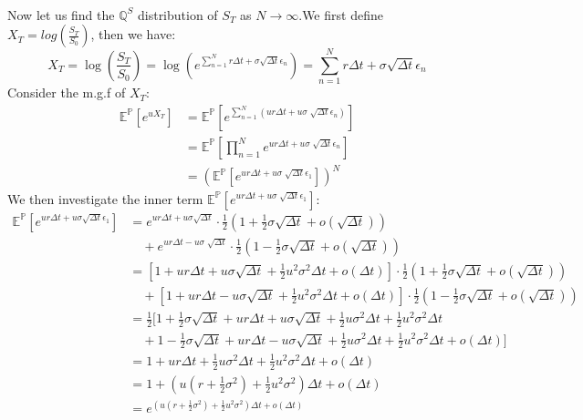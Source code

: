 \documentclass[12pt, letterpaper]{article}
\begin{document}
\\
Now let us find the $\mathbb{Q}^S$ distribution of $S_T$ as $N \rightarrow \infty$.We first define $X_T = log(\frac{S_T}{S_0})$, then we have: 
\[X_T = \log(\frac{S_T}{S_0}) = \log(e^{\sum_{n=1}^N r\Delta t + \sigma \sqrt{\Delta t} \epsilon_n}) = \sum_{n=1}^N r\Delta t + \sigma \sqrt{\Delta t} \epsilon_n \]
Consider the m.g.f of $X_T$:
\begin{align*}
  \mathbb{E}^\mathbb{P}[e^{u X_T}] & =  \mathbb{E}^\mathbb{P}[e^{\sum_{n=1}^N (u r\Delta t+u\sigma \sqrt[]{\Delta t} \epsilon_n)}] \\
  & = \mathbb{E}^\mathbb{P} [\prod_{n=1}^N e^{u r\Delta t+u\sigma \sqrt[]{\Delta t} \epsilon_n}] \\
  & = (\mathbb{E}^\mathbb{P} [e^{u r\Delta t+u\sigma \sqrt[]{\Delta t} \epsilon_1}])^N \tag*{as $\epsilon_n$ is i.i.d}
\end{align*}
We then investigate the inner term $\mathbb{E}^\mathbb{P} [e^{u r\Delta t+ u\sigma \sqrt[]{\Delta t} \epsilon_1}]$:
\begin{align*}
  \mathbb{E}^\mathbb{P} [e^{u r\Delta t+u\sigma \sqrt{\Delta t} \epsilon_1}] &= e^{u r\Delta t +u\sigma \sqrt{\Delta t}} \cdot \frac{1}{2} (1 + \frac{1}{2}{\sigma} \sqrt{\Delta t} + o(\sqrt{\Delta t})) \\ 
    & \quad + e^{u r\Delta t-u\sigma \sqrt[]{\Delta t}} \cdot \frac{1}{2} (1 - \frac{1}{2}{\sigma} \sqrt{\Delta t} + o(\sqrt{\Delta t})) \\
    &= [1+u r\Delta t+u \sigma \sqrt{\Delta t} +\frac{1}{2}u^2\sigma^2\Delta t + o(\Delta t)] \cdot \frac{1}{2} (1 + \frac{1}{2}{\sigma} \sqrt{\Delta t} + o(\sqrt{\Delta t})) \\ 
    & \quad + [1+u r\Delta t-u \sigma \sqrt{\Delta t} +\frac{1}{2}u^2\sigma^2\Delta t + o(\Delta t)] \cdot \frac{1}{2} (1 - \frac{1}{2}{\sigma} \sqrt{\Delta t} + o(\sqrt{\Delta t})) \\
    &= \frac{1}{2}[1 + \frac{1}{2}\sigma\sqrt{\Delta t} + ur\Delta t + u\sigma \sqrt{\Delta t} + \frac{1}{2}u\sigma^2\Delta t + \frac{1}{2}u^2\sigma^2\Delta t \\
    & \quad + 1 - \frac{1}{2}\sigma\sqrt{\Delta t} + ur\Delta t - u\sigma \sqrt{\Delta t} + \frac{1}{2}u\sigma^2\Delta t + \frac{1}{2}u^2\sigma^2\Delta t + o(\Delta t)] \\
    &= 1 + ur\Delta t + \frac{1}{2} u\sigma^2\Delta t + \frac{1}{2}u^2\sigma^2\Delta t + o(\Delta t) \\
    &= 1 + (u(r+\frac{1}{2}\sigma^2) + \frac{1}{2}u^2\sigma^2) \Delta t + o(\Delta t) \\
    &= e^{(u(r+\frac{1}{2}\sigma^2) + \frac{1}{2}u^2\sigma^2) \Delta t + o(\Delta t)}
\end{align*}
\end{document}
